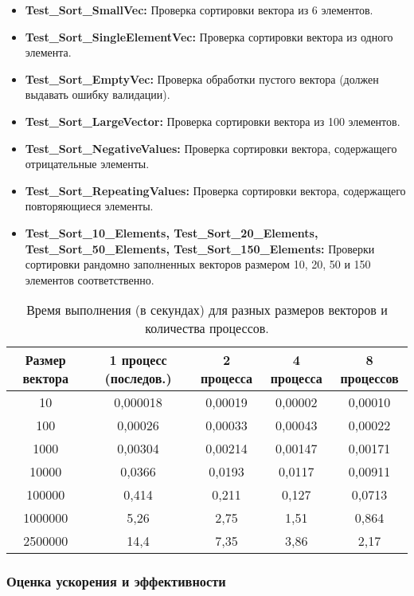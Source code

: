 \documentclass[12pt]{article}
\begin{document}
\begin{itemize}
    \item \textbf{Test\_Sort\_SmallVec:} Проверка сортировки вектора из 6 элементов.
    \item \textbf{Test\_Sort\_SingleElementVec:} Проверка сортировки вектора из одного элемента.
    \item \textbf{Test\_Sort\_EmptyVec:} Проверка обработки пустого вектора (должен выдавать ошибку валидации).
    \item \textbf{Test\_Sort\_LargeVector:} Проверка сортировки вектора из 100 элементов.
    \item \textbf{Test\_Sort\_NegativeValues:} Проверка сортировки вектора, содержащего отрицательные элементы.
    \item \textbf{Test\_Sort\_RepeatingValues:} Проверка сортировки вектора, содержащего повторяющиеся элементы.
    \item \textbf{Test\_Sort\_10\_Elements, Test\_Sort\_20\_Elements, Test\_Sort\_50\_Elements, Test\_Sort\_150\_Elements:} Проверки сортировки рандомно заполненных векторов размером 10, 20, 50 и 150 элементов соответственно.
\end{itemize}
\begin{table}[htbp]
\centering
\caption{Время выполнения (в секундах) для разных размеров векторов и количества процессов.}
    \label{tab:time}
    \begin{tabular}{|c|c|c|c|c|}
    \hline
    Размер вектора & 1 процесс (последов.) & 2 процесса & 4 процесса & 8 процессов\\ \hline
    10 & 0,000018 & 0,00019 & 0,00002 & 0,00010 \\ \hline
    100 & 0,00026 & 0,00033 & 0,00043 & 0,00022  \\ \hline
    1000 & 0,00304 & 0,00214 & 0,00147 & 0,00171  \\ \hline
    10000 & 0,0366 & 0,0193 & 0,0117 & 0,00911  \\ \hline
    100000 & 0,414 & 0,211 & 0,127 & 0,0713 \\ \hline
    1000000 & 5,26 & 2,75 & 1,51 & 0,864  \\ \hline
    2500000 & 14,4 & 7,35 & 3,86 & 2,17 \\ \hline
    \end{tabular}
\end{table}
\subsubsection*{Оценка ускорения и эффективности}
\end{document}
